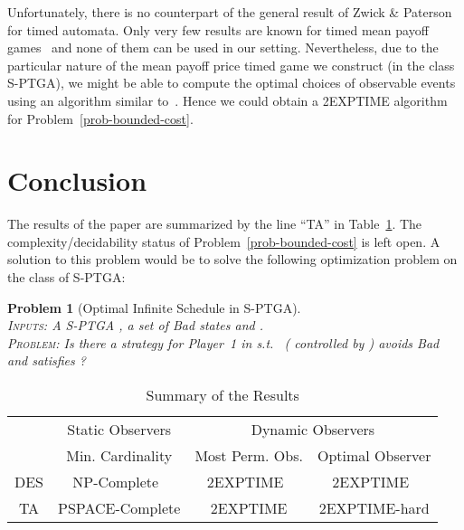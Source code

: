 \documentclass[letterpaper,10pt,conference]{ieeeconf}  \IEEEoverridecommandlockouts                              \overrideIEEEmargins
\def\st{{s.t.}~}
\newtheorem{prob}{Problem}  \newtheorem{definition}{Definition}
\begin{document}
Unfortunately, there is no counterpart of the general result of Zwick
\& Paterson for timed automata.  Only very few results are known for
timed mean payoff
games~\cite{BLMR-fsttcs2006,bflms-formats08,bbjlr-formats08,BFLM-hscc10}
and none of them can be used in our setting.  Nevertheless, due to the
particular nature of the mean payoff price timed game we construct (in
the class S-PTGA), we might be able to compute the optimal choices of
observable events using an algorithm similar to~\cite{BBL-fmsd06}.
Hence we could obtain a 2EXPTIME algorithm for
Problem~\ref{prob-bounded-cost}.


\section{Conclusion}\label{sec-conclu}



The results of the paper are summarized by the line ``TA'' in
Table~\ref{tab-summary}.  The complexity/decidability status of
Problem~\ref{prob-bounded-cost} is left open.  A solution to this
problem would be to solve the following optimization problem on the
class of S-PTGA:
\begin{prob}[Optimal Infinite Schedule in S-PTGA] \mbox{}\\
  \textsc{Inputs:} A S-PTGA , a set of \emph{Bad} states and .\\
  \textsc{Problem:} Is there a strategy  for Player~1 in  \st
   ( controlled by ) avoids \emph{Bad} and satisfies ?
\end{prob}

\newcommand{\vtab}[1]{
  \begin{tabular}[c]{c}
    #1
  \end{tabular}
}
\begin{table}[t]
  \centering
  \caption{Summary of the Results}
  \label{tab-summary}
  \begin{tabular}[t]{||c|c|c|c||}\hline\hline
    &  Static Observers   & \multicolumn{2}{c||}{Dynamic Observers} \\\cline{3-4}
    &  Min. Cardinality   & Most Perm. Obs. & Optimal Observer \\\hline\hline
    DES & NP-Complete~\cite{cassez-acsd-07} & 2EXPTIME~\cite{cassez-acsd-07} & 2EXPTIME~\cite{cassez-tase-07}   \\\hline
    TA & PSPACE-Complete & 2EXPTIME  &  2EXPTIME-hard \\\hline\hline
  \end{tabular}
\end{table}
\end{document}
